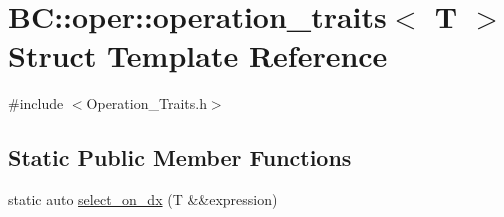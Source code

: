 \hypertarget{structBC_1_1oper_1_1operation__traits}{}\section{BC\+:\+:oper\+:\+:operation\+\_\+traits$<$ T $>$ Struct Template Reference}
\label{structBC_1_1oper_1_1operation__traits}


{\ttfamily \#include $<$Operation\+\_\+\+Traits.\+h$>$}

\subsection*{Static Public Member Functions}
\begin{DoxyCompactItemize}
\item 
static auto \hyperlink{structBC_1_1oper_1_1operation__traits_ab00c4207b74c0973f45a904aa157de0d}{select\+\_\+on\+\_\+dx} (T \&\&expression)
\end{DoxyCompactItemize}
